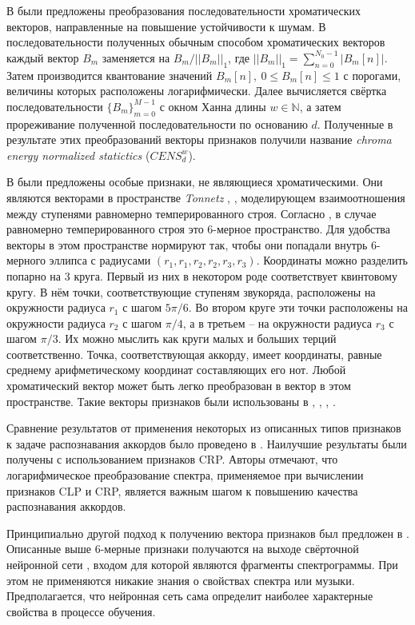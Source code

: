 В \cite{Mueller2007} были предложены преобразования последовательности
хроматических векторов, направленные на повышение устойчивости к шумам.
В последовательности полученных обычным способом хроматических векторов каждый
вектор $B_m$ заменяется на $B_m/||B_m||_1$, где $||B_m||_1 = \sum_{n=0}^{N_0-1}
|B_m[n]|$. Затем производится квантование значений $B_m[n],~0 \leq B_m[n] \leq
1$ с порогами, величины которых расположены логарифмически. Далее вычисляется
свёртка последовательности $\{B_m\}_{m=0}^{M-1}$ с окном Ханна длины $w \in
\mathbb{N}$, а затем прореживание полученной последовательности по основанию
$d$. Полученные в результате этих преобразований векторы признаков получили
название \emph{chroma energy normalized statictics} ($CENS_d^w$).

В \cite{Harte2006} были предложены особые признаки, не являющиеся
хроматическими. Они являются векторами в пространстве \emph{Tonnetz}
\cite{Cohn1998}, \cite{Chew2000}, моделирующем взаимоотношения между ступенями
равномерно темперированного строя. Согласно \cite{Harte2006}, в случае
равномерно темперированного строя это 6-мерное пространство. Для удобства
векторы в этом пространстве нормируют так, чтобы они попадали внутрь 6-мерного
эллипса с радиусами $(r_1, r_1, r_2, r_2, r_3, r_3)$. Координаты можно разделить
попарно на 3 круга. Первый из них в некотором роде соответствует квинтовому
кругу. В нём точки, соответствующие ступеням звукоряда, расположены на
окружности радиуса $r_1$ с шагом $5\pi / 6$. Во втором круге эти точки
расположены на окружности радиуса $r_2$ с шагом $\pi/4$, а в третьем -- на
окружности радиуса $r_3$ с шагом $\pi/3$. Их можно мыслить как круги малых и
больших терций соответственно. Точка, соответствующая аккорду, имеет координаты,
равные среднему арифметическому координат составляющих его нот. Любой
хроматический вектор может быть легко преобразован в вектор в этом пространстве.
Такие векторы признаков были использованы в \cite{Lee2007}, \cite{Lee2008},
\cite{Chen2012}, \cite{Humphrey2012}.

Сравнение результатов от применения некоторых из описанных типов признаков к
задаче распознавания аккордов было проведено в \cite{Jiang2011}. Наилучшие
результаты были получены с использованием признаков CRP. Авторы отмечают, что
логарифмическое преобразование спектра, применяемое при вычислении признаков
CLP и CRP, является важным шагом к повышению качества распознавания аккордов.

Принципиально другой подход к получению вектора признаков был предложен в
\cite{Humphrey2012}. Описанные выше 6-мерные признаки получаются на выходе
свёрточной нейронной сети \cite{LeCun1998}, входом для которой являются
фрагменты спектрограммы. При этом не применяются никакие знания о свойствах
спектра или музыки. Предполагается, что нейронная сеть сама определит наиболее
характерные свойства в процессе обучения.

